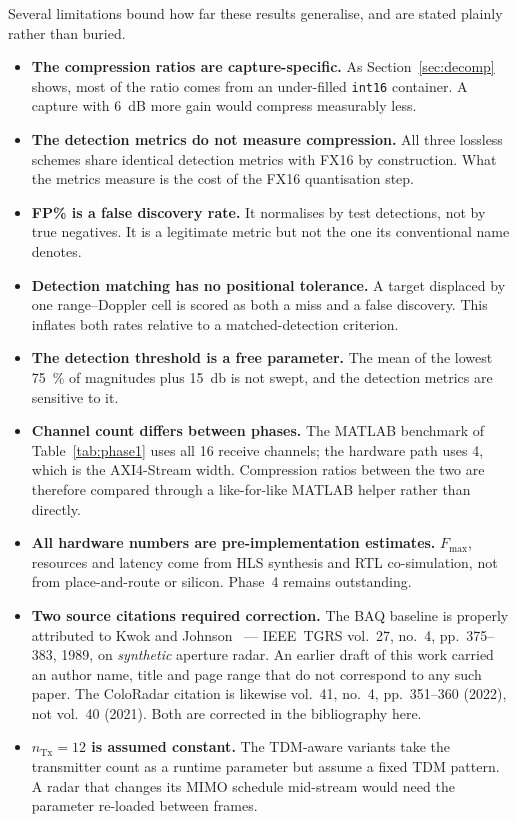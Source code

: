 \documentclass[10pt,twocolumn]{article}
\begin{document}
Several limitations bound how far these results generalise, and are stated
plainly rather than buried.

\begin{itemize}\itemsep2pt
\item \textbf{The compression ratios are capture-specific.} As
  Section~\ref{sec:decomp} shows, most of the ratio comes from an under-filled
  \texttt{int16} container. A capture with \SI{6}{dB} more gain would compress
  measurably less.

\item \textbf{The detection metrics do not measure compression.} All three
  lossless schemes share identical detection metrics with FX16 by construction.
  What the metrics measure is the cost of the FX16 quantisation step.

\item \textbf{FP\% is a false discovery rate.} It normalises by test
  detections, not by true negatives. It is a legitimate metric but not the one
  its conventional name denotes.

\item \textbf{Detection matching has no positional tolerance.} A target
  displaced by one range--Doppler cell is scored as both a miss and a false
  discovery. This inflates both rates relative to a matched-detection
  criterion.

\item \textbf{The detection threshold is a free parameter.} The mean of the
  lowest \SI{75}{\percent} of magnitudes plus \SI{15}{\decibel} is not swept,
  and the detection metrics are sensitive to it.

\item \textbf{Channel count differs between phases.} The MATLAB benchmark of
  Table~\ref{tab:phase1} uses all 16 receive channels; the hardware path uses
  4, which is the AXI4-Stream width. Compression ratios between the two are
  therefore compared through a like-for-like MATLAB helper rather than
  directly.

\item \textbf{All hardware numbers are pre-implementation estimates.}
  $F_{\max}$, resources and latency come from HLS synthesis and RTL
  co-simulation, not from place-and-route or silicon. Phase~4 remains
  outstanding.

\item \textbf{Two source citations required correction.} The BAQ baseline is
  properly attributed to Kwok and Johnson~\cite{kwok1989baq} --- IEEE~TGRS
  vol.~27, no.~4, pp.~375--383, 1989, on \emph{synthetic} aperture radar. An
  earlier draft of this work carried an author name, title and page range that
  do not correspond to any such paper. The ColoRadar citation is likewise
  vol.~41, no.~4, pp.~351--360 (2022), not vol.~40 (2021). Both are corrected
  in the bibliography here.

\item \textbf{$n_{\mathrm{Tx}} = 12$ is assumed constant.} The TDM-aware
  variants take the transmitter count as a runtime parameter but assume a fixed
  TDM pattern. A radar that changes its MIMO schedule mid-stream would need the
  parameter re-loaded between frames.
\end{itemize}
\end{document}
